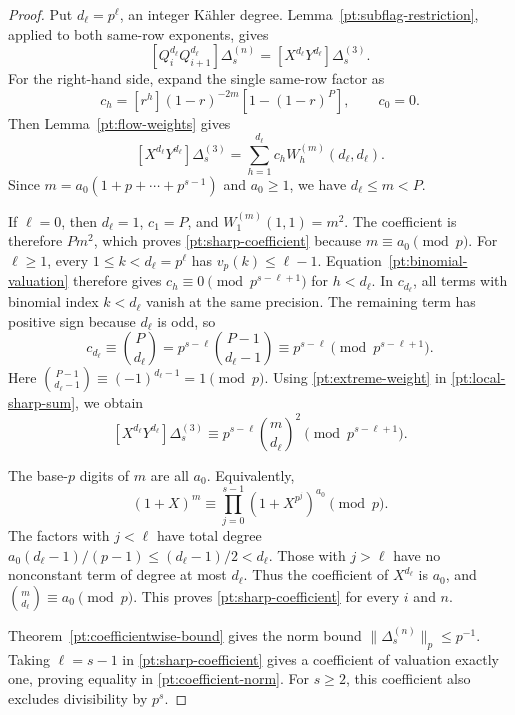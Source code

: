 \documentclass[11pt]{amsart}
\theoremstyle{definition}
\theoremstyle{remark}
\numberwithin{equation}{section}
\begin{document}
\begin{proof}
Put $d_\ell=p^\ell$, an integer K\"ahler degree.
Lemma~\ref{pt:subflag-restriction}, applied to both same-row
exponents, gives
\begin{equation}\label{pt:sharp-face-coefficient}
 [Q_i^{d_\ell}Q_{i+1}^{d_\ell}]\Delta_s^{(n)}
 =[X^{d_\ell}Y^{d_\ell}]\Delta_s^{(3)}.
\end{equation}
For the right-hand side, expand the single same-row factor as
\[
 c_h=[r^h](1-r)^{-2m}\left[1-(1-r)^P\right],\qquad c_0=0.
\]
Then Lemma~\ref{pt:flow-weights} gives
\begin{equation}\label{pt:local-sharp-sum}
 [X^{d_\ell}Y^{d_\ell}]\Delta_s^{(3)}
 =\sum_{h=1}^{d_\ell}c_hW_h^{(m)}(d_\ell,d_\ell).
\end{equation}
Since $m=a_0(1+p+\cdots+p^{s-1})$ and $a_0\geq1$, we have
$d_\ell\leq m<P$.

If $\ell=0$, then $d_\ell=1$, $c_1=P$, and
$W_1^{(m)}(1,1)=m^2$. The coefficient is therefore $Pm^2$,
which proves \eqref{pt:sharp-coefficient} because
$m\equiv a_0\pmod p$.
For $\ell\geq1$, every $1\leq k<d_\ell=p^\ell$ has
$v_p(k)\leq\ell-1$. Equation~\eqref{pt:binomial-valuation}
therefore gives
$c_h\equiv0\pmod{p^{s-\ell+1}}$ for $h<d_\ell$.
In $c_{d_\ell}$, all terms with binomial index $k<d_\ell$
vanish at the same precision. The remaining term has positive sign because
$d_\ell$ is odd, so
\[
 c_{d_\ell}\equiv\binom P{d_\ell}
 =p^{s-\ell}\binom{P-1}{d_\ell-1}
 \equiv p^{s-\ell}\pmod{p^{s-\ell+1}}.
\]
Here $\binom{P-1}{d_\ell-1}\equiv(-1)^{d_\ell-1}=1\pmod p$.
Using \eqref{pt:extreme-weight} in
\eqref{pt:local-sharp-sum}, we obtain
\[
 [X^{d_\ell}Y^{d_\ell}]\Delta_s^{(3)}
 \equiv p^{s-\ell}\binom m{d_\ell}^2\pmod{p^{s-\ell+1}}.
\]

The base-$p$ digits of $m$ are all $a_0$. Equivalently,
\[
 (1+X)^m\equiv\prod_{j=0}^{s-1}(1+X^{p^j})^{a_0}\pmod p.
\]
The factors with $j<\ell$ have total degree
$a_0(d_\ell-1)/(p-1)\leq(d_\ell-1)/2<d_\ell$.
Those with $j>\ell$ have no nonconstant term of degree at most
$d_\ell$. Thus the
coefficient of $X^{d_\ell}$ is $a_0$, and
$\binom m{d_\ell}\equiv a_0\pmod p$. This proves
\eqref{pt:sharp-coefficient} for every $i$ and $n$.

Theorem~\ref{pt:coefficientwise-bound} gives the norm bound
$\|\Delta_s^{(n)}\|_p\leq p^{-1}$. Taking $\ell=s-1$ in
\eqref{pt:sharp-coefficient} gives a coefficient of valuation
exactly one, proving equality in \eqref{pt:coefficient-norm}.
For $s\geq2$, this coefficient also excludes divisibility by
$p^s$.
\end{proof}
\end{document}
